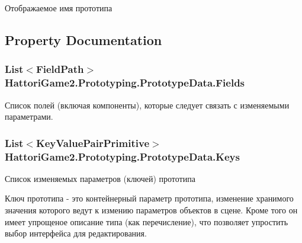 Отображаемое имя прототипа 



\subsection{Property Documentation}
\hypertarget{class_hattori_game2_1_1_prototyping_1_1_prototype_data_af0ff4fa301c4c5f71805396bafab60f7_af0ff4fa301c4c5f71805396bafab60f7}{}
\subsubsection[{Fields}]{\setlength{\rightskip}{0pt plus 5cm}List$<${\bf Field\+Path}$>$ Hattori\+Game2.\+Prototyping.\+Prototype\+Data.\+Fields\hspace{0.3cm}{\ttfamily [get]}}\label{class_hattori_game2_1_1_prototyping_1_1_prototype_data_af0ff4fa301c4c5f71805396bafab60f7_af0ff4fa301c4c5f71805396bafab60f7}


Список полей (включая компоненты), которые следует связать с изменяемыми параметрами. 

\hypertarget{class_hattori_game2_1_1_prototyping_1_1_prototype_data_adeb9b7b2375419356a996c8650d76c1c_adeb9b7b2375419356a996c8650d76c1c}{}
\subsubsection[{Keys}]{\setlength{\rightskip}{0pt plus 5cm}List$<${\bf Key\+Value\+Pair\+Primitive}$>$ Hattori\+Game2.\+Prototyping.\+Prototype\+Data.\+Keys\hspace{0.3cm}{\ttfamily [get]}}\label{class_hattori_game2_1_1_prototyping_1_1_prototype_data_adeb9b7b2375419356a996c8650d76c1c_adeb9b7b2375419356a996c8650d76c1c}


Список изменяемых параметров (ключей) прототипа 

Ключ прототипа -\/ это контейнерный параметр прототипа, изменение хранимого значения которого ведут к измению параметров объектов в сцене. Кроме того он имеет упрощеное описание типа (как перечисление), что позволяет упростить выбор интерфейса для редактирования.\hypertarget{class_hattori_game2_1_1_prototyping_1_1_prototype_data_ad41d44ad2fdeaca9288581c3642f6efa_ad41d44ad2fdeaca9288581c3642f6efa}{}
